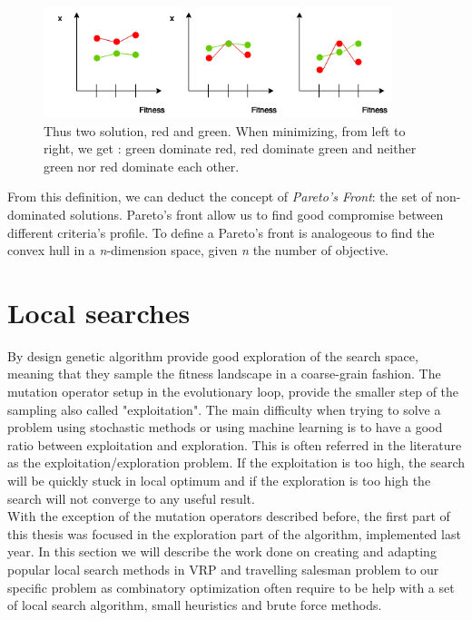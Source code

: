 \documentclass[12pt]{memoir}
\begin{document}
\begin{figure}[htbp]
	\begin{center}
		\includegraphics[width=4in]{img/paretoDominance.png}
		\caption{Thus two solution, red and green. When minimizing, from left to right, we get : green dominate red, red dominate green and neither green nor red dominate each other.}
	\end{center}
\end{figure}



From this definition, we can deduct the concept of \emph{Pareto's Front}: the set of non-dominated solutions. Pareto's front allow us to find good compromise between different criteria's profile. To define a Pareto's front is analogeous to find the convex hull\cite{godfrey2007algorithms} in a \textit{n}-dimension space, given \textit{n} the number of objective.

\label{par:Multi-objective selection }


\section{Local searches}
By design genetic algorithm provide good exploration of the search space, meaning that they sample the fitness landscape in a coarse-grain fashion.
The mutation operator setup in the evolutionary loop, provide the smaller step of the sampling also called "exploitation". The main difficulty when trying to 
solve a problem using stochastic methods or using machine learning is to have a good ratio between exploitation and exploration. This is often referred in the literature as the exploitation/exploration problem. If the exploitation is too high, the search will be quickly stuck in local optimum and if the exploration is too high the search will not converge to any useful result. \\
With the exception of the mutation operators described before, the first part of this thesis was focused in the exploration part of the algorithm, implemented last year. In this section we will describe the work done on creating and adapting popular local search methods in VRP and travelling salesman problem to our specific problem as combinatory optimization often require to be help with a set of local search algorithm, small heuristics and brute force methods.
\end{document}
